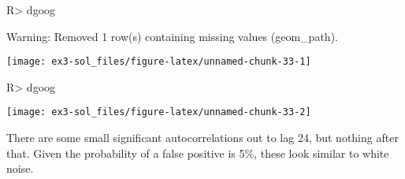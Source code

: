 \documentclass[
]{article}
\begin{document}
\begin{CodeChunk}
\begin{CodeInput}
R> dgoog %
\end{CodeInput}
\begin{CodeOutput}
Warning: Removed 1 row(s) containing missing values (geom_path).
\end{CodeOutput}


\begin{center}\texttt{[image: ex3-sol\_files/figure-latex/unnamed-chunk-33-1]} \end{center}

\begin{CodeInput}
R> dgoog %
\end{CodeInput}


\begin{center}\texttt{[image: ex3-sol\_files/figure-latex/unnamed-chunk-33-2]} \end{center}

\end{CodeChunk}

There are some small significant autocorrelations out to lag 24, but nothing after that. Given the probability of a false positive is 5\%, these look similar to white noise.
\end{document}
